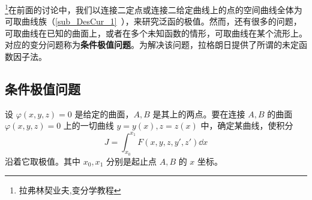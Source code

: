 
\footnote{拉弗林契业夫,变分学教程}在前面的讨论中，我们以连接二定点或连接二给定曲线上的点的空间曲线全体为可取曲线族（\autoref{sub_DesCur_1}~），来研究泛函的极值。然而，还有很多的问题，可取曲线在已知的曲面上，或者在多个未知函数的情形，可取曲线在某个流形上。对应的变分问题称为\textbf{条件极值问题}。为解决该问题，拉格朗日提供了所谓的未定函数因子法。
\subsection{条件极值问题}
设 $\varphi(x,y,z)=0$ 是给定的曲面，$A,B$ 是其上的两点。要在连接 $A,B$ 的曲面$\varphi(x,y,z)=0$ 上的一切曲线 $y=y(x),z=z(x)$ 中，确定某曲线，使积分
\begin{equation}
J=\int_{x_0}^{x_1}F(x,y,z,y',z')\dd x
\end{equation}
沿着它取极值。其中 $x_0,x_1$ 分别是起止点 $A,B$ 的 $x$ 坐标。